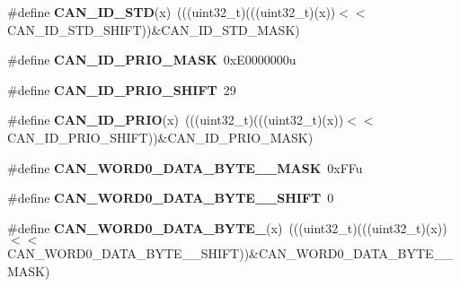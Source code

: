 \begin{DoxyCompactItemize}
\item 
\#define {\bfseries C\+A\+N\+\_\+\+I\+D\+\_\+\+S\+TD}(x)~(((uint32\+\_\+t)(((uint32\+\_\+t)(x))$<$$<$C\+A\+N\+\_\+\+I\+D\+\_\+\+S\+T\+D\+\_\+\+S\+H\+I\+FT))\&C\+A\+N\+\_\+\+I\+D\+\_\+\+S\+T\+D\+\_\+\+M\+A\+SK)\hypertarget{group__CAN__Register__Masks_ga67395c1778e9a7ba45f490a9b13db60b}{}\label{group__CAN__Register__Masks_ga67395c1778e9a7ba45f490a9b13db60b}

\item 
\#define {\bfseries C\+A\+N\+\_\+\+I\+D\+\_\+\+P\+R\+I\+O\+\_\+\+M\+A\+SK}~0x\+E0000000u\hypertarget{group__CAN__Register__Masks_gac1e36313ed3d0d09eec97537d3bda962}{}\label{group__CAN__Register__Masks_gac1e36313ed3d0d09eec97537d3bda962}

\item 
\#define {\bfseries C\+A\+N\+\_\+\+I\+D\+\_\+\+P\+R\+I\+O\+\_\+\+S\+H\+I\+FT}~29\hypertarget{group__CAN__Register__Masks_ga7bd5cd878ee64f1b60ff983442ae7aa9}{}\label{group__CAN__Register__Masks_ga7bd5cd878ee64f1b60ff983442ae7aa9}

\item 
\#define {\bfseries C\+A\+N\+\_\+\+I\+D\+\_\+\+P\+R\+IO}(x)~(((uint32\+\_\+t)(((uint32\+\_\+t)(x))$<$$<$C\+A\+N\+\_\+\+I\+D\+\_\+\+P\+R\+I\+O\+\_\+\+S\+H\+I\+FT))\&C\+A\+N\+\_\+\+I\+D\+\_\+\+P\+R\+I\+O\+\_\+\+M\+A\+SK)\hypertarget{group__CAN__Register__Masks_gaeaa0dd64fdad35cb7c9565117e6f7a95}{}\label{group__CAN__Register__Masks_gaeaa0dd64fdad35cb7c9565117e6f7a95}

\item 
\#define {\bfseries C\+A\+N\+\_\+\+W\+O\+R\+D0\+\_\+\+D\+A\+T\+A\+\_\+\+B\+Y\+T\+E\+\_\+\_\+\+M\+A\+SK}~0x\+F\+Fu\hypertarget{group__CAN__Register__Masks_ga2b8efb33402c5777d3d7b40c0c84eaac}{}\label{group__CAN__Register__Masks_ga2b8efb33402c5777d3d7b40c0c84eaac}

\item 
\#define {\bfseries C\+A\+N\+\_\+\+W\+O\+R\+D0\+\_\+\+D\+A\+T\+A\+\_\+\+B\+Y\+T\+E\+\_\+\_\+\+S\+H\+I\+FT}~0\hypertarget{group__CAN__Register__Masks_ga3835334fa3df07e17141619f9bdb33df}{}\label{group__CAN__Register__Masks_ga3835334fa3df07e17141619f9bdb33df}

\item 
\#define {\bfseries C\+A\+N\+\_\+\+W\+O\+R\+D0\+\_\+\+D\+A\+T\+A\+\_\+\+B\+Y\+T\+E\+\_}(x)~(((uint32\+\_\+t)(((uint32\+\_\+t)(x))$<$$<$C\+A\+N\+\_\+\+W\+O\+R\+D0\+\_\+\+D\+A\+T\+A\+\_\+\+B\+Y\+T\+E\+\_\+\_\+\+S\+H\+I\+FT))\&C\+A\+N\+\_\+\+W\+O\+R\+D0\+\_\+\+D\+A\+T\+A\+\_\+\+B\+Y\+T\+E\+\_\+\_\+\+M\+A\+SK)\hypertarget{group__CAN__Register__Masks_ga6003475760ed870fa3edaa34a75f2170}{}\label{group__CAN__Register__Masks_ga6003475760ed870fa3edaa34a75f2170}


\end{DoxyCompactItemize}
